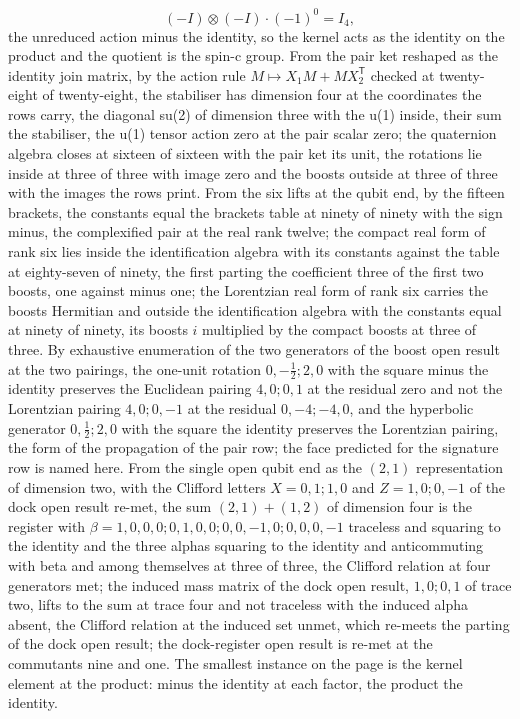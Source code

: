 \begin{chproof}[finite]
\begin{equation}
(-I) \otimes (-I) \cdot (-1)^{0} = I_{4} ,
\end{equation}
the unreduced action minus the identity, so the kernel acts as the identity on the product and the quotient is the spin-c group. From the pair ket reshaped as the identity join matrix, by the action rule $M \mapsto X_{1} M + M X_{2}^{\mathsf{T}}$ checked at twenty-eight of twenty-eight, the stabiliser has dimension four at the coordinates the rows carry, the diagonal su(2) of dimension three with the u(1) inside, their sum the stabiliser, the u(1) tensor action zero at the pair scalar zero; the quaternion algebra closes at sixteen of sixteen with the pair ket its unit, the rotations lie inside at three of three with image zero and the boosts outside at three of three with the images the rows print. From the six lifts at the qubit end, by the fifteen brackets, the constants equal the brackets table at ninety of ninety with the sign minus, the complexified pair at the real rank twelve; the compact real form of rank six lies inside the identification algebra with its constants against the table at eighty-seven of ninety, the first parting the coefficient three of the first two boosts, one against minus one; the Lorentzian real form of rank six carries the boosts Hermitian and outside the identification algebra with the constants equal at ninety of ninety, its boosts $i$ multiplied by the compact boosts at three of three. By exhaustive enumeration of the two generators of the boost open result at the two pairings, the one-unit rotation $0,-\tfrac{1}{2};2,0$ with the square minus the identity preserves the Euclidean pairing $4,0;0,1$ at the residual zero and not the Lorentzian pairing $4,0;0,-1$ at the residual $0,-4;-4,0$, and the hyperbolic generator $0,\tfrac{1}{2};2,0$ with the square the identity preserves the Lorentzian pairing, the form of the propagation of the pair row; the face predicted for the signature row is named here. From the single open qubit end as the $(2,1)$ representation of dimension two, with the Clifford letters $X = 0,1;1,0$ and $Z = 1,0;0,-1$ of the dock open result re-met, the sum $(2,1)+(1,2)$ of dimension four is the register with $\beta = 1,0,0,0;0,1,0,0;0,0,-1,0;0,0,0,-1$ traceless and squaring to the identity and the three alphas squaring to the identity and anticommuting with beta and among themselves at three of three, the Clifford relation at four generators met; the induced mass matrix of the dock open result, $1,0;0,1$ of trace two, lifts to the sum at trace four and not traceless with the induced alpha absent, the Clifford relation at the induced set unmet, which re-meets the parting of the dock open result; the dock-register open result is re-met at the commutants nine and one. The smallest instance on the page is the kernel element at the product: minus the identity at each factor, the product the identity.


\end{chproof}
